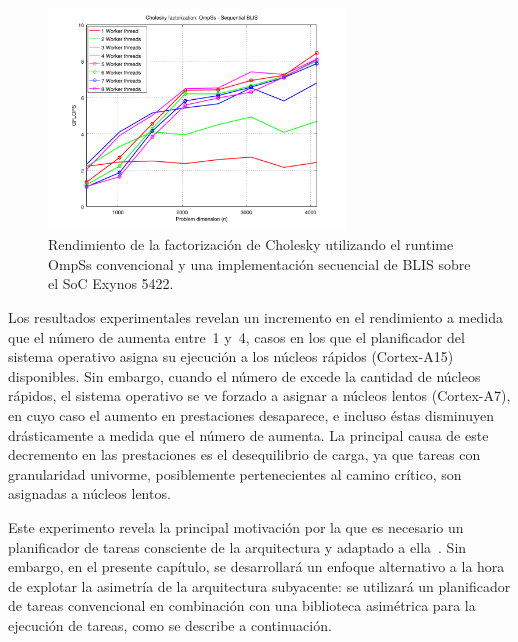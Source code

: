 \begin{figure}
\centering
\includegraphics[width=0.70\textwidth]{Plots/Orig_runtime/plot_1to8_th}
\caption{Rendimiento de la factorización de Cholesky utilizando el runtime OmpSs convencional y una implementación secuencial
	de BLIS sobre el SoC Exynos 5422.}
\label{fig:ompss_blis_oversubscription}
\end{figure}


Los resultados experimentales revelan un incremento en el rendimiento a medida que el número de \wts aumenta entre~1 y~4,
casos en los que el planificador del sistema operativo asigna su ejecución a los núcleos rápidos (Cortex-A15) disponibles.
Sin embargo, cuando el número de \wts excede la cantidad de núcleos rápidos, el sistema operativo se ve forzado a asignar
\wts a núcleos lentos (Cortex-A7), en cuyo caso el aumento en prestaciones desaparece, e incluso éstas disminuyen drásticamente 
a medida que el número de \wts aumenta. La principal causa de este decremento en las prestaciones es el desequilibrio de carga,
ya que tareas con granularidad univorme, posiblemente pertenecientes al camino crítico, son asignadas a núcleos lentos.

Este experimento revela la principal motivación por la que es necesario un planificador de tareas consciente de la
arquitectura y adaptado a ella~\cite{OmpSsbigLITTLE}. Sin embargo, en el presente capítulo, se desarrollará un enfoque alternativo
a la hora de explotar la asimetría de la arquitectura subyacente: se utilizará un planificador de tareas convencional en combinación
con una biblioteca asimétrica para la ejecución de tareas, como se describe a continuación.

